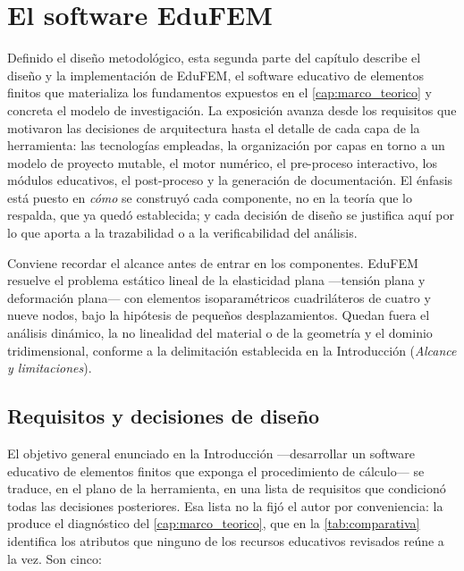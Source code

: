\section{El software EduFEM}
\label{sec:diseno-edufem}

Definido el diseño metodológico, esta segunda parte del capítulo describe el diseño y la implementación de EduFEM, el software educativo de elementos finitos que materializa los fundamentos expuestos en el \autoref{cap:marco_teorico} y concreta el modelo de investigación. La exposición avanza desde los requisitos que motivaron las decisiones de arquitectura hasta el detalle de cada capa de la herramienta: las tecnologías empleadas, la organización por capas en torno a un modelo de proyecto mutable, el motor numérico, el pre-proceso interactivo, los módulos educativos, el post-proceso y la generación de documentación. El énfasis está puesto en \emph{cómo} se construyó cada componente, no en la teoría que lo respalda, que ya quedó establecida; y cada decisión de diseño se justifica aquí por lo que aporta a la trazabilidad o a la verificabilidad del análisis.

Conviene recordar el alcance antes de entrar en los componentes. EduFEM resuelve el problema estático lineal de la elasticidad plana —tensión plana y deformación plana— con elementos isoparamétricos cuadriláteros de cuatro y nueve nodos, bajo la hipótesis de pequeños desplazamientos. Quedan fuera el análisis dinámico, la no linealidad del material o de la geometría y el dominio tridimensional, conforme a la delimitación establecida en la Introducción (\emph{Alcance y limitaciones}).

\subsection{Requisitos y decisiones de diseño}
\label{sec:requisitos}

El objetivo general enunciado en la Introducción —desarrollar un software educativo de elementos finitos que exponga el procedimiento de cálculo— se traduce, en el plano de la herramienta, en una lista de requisitos que condicionó todas las decisiones posteriores. Esa lista no la fijó el autor por conveniencia: la produce el diagnóstico del \autoref{cap:marco_teorico}, que en la \autoref{tab:comparativa} identifica los atributos que ninguno de los recursos educativos revisados reúne a la vez. Son cinco:

